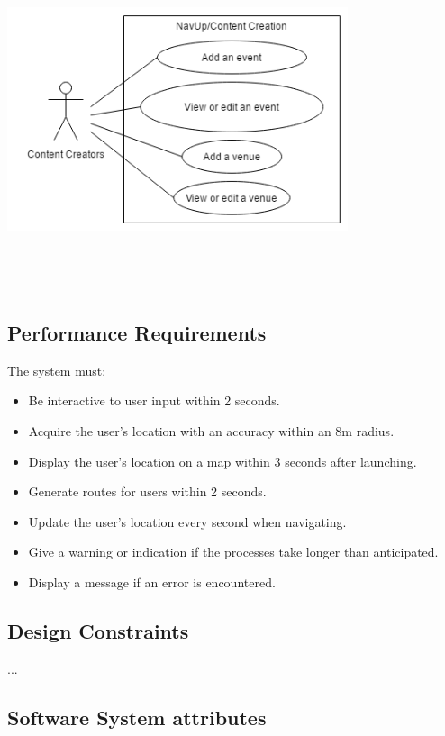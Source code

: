 \documentclass[english]{article}
\begin{document}
					\includegraphics[width=10cm,height=10cm,keepaspectratio]{NavUp_Content_Creation.png}

				\subsection{Performance Requirements}
    				The system must:
    				\begin{itemize}
        				\item Be interactive to user input within 2 seconds.
        				\item Acquire the user's location with an accuracy within an 8m radius.
        				\item Display the user's location on a map within 3 seconds after launching.
        				\item Generate routes for users within 2 seconds.
        				\item Update the user's location every second when navigating.
        				\item Give a warning or indication if the processes take longer than anticipated.
        				\item Display a message if an error is encountered.
    				\end{itemize}


				\subsection{Design Constraints}
						...
	
				\subsection{Software System attributes}
				
\end{document}
